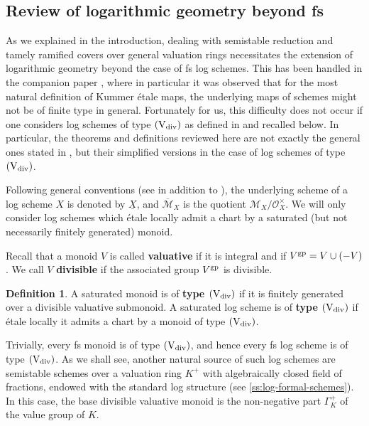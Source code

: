 \documentclass[a4paper,twoside,11pt,reqno]{amsart}
\newcommand{\cM}{{\mathcal M}}
\newcommand{\cO}{{\mathcal O}}
\newcommand{\gp}{{\rm gp}}
\newcommand{\typeVd}{(\mathrm{V}_{\rm div})}
\theoremstyle{definition}
\newtheorem{defi}[thm]{Definition}
\numberwithin{equation}{subsection}
\begin{document}
\subsection{Review of logarithmic geometry beyond fs} 
\label{ss:log-review}

As we explained in the introduction, dealing with semistable reduction and tamely ramified covers over general valuation rings necessitates the extension of logarithmic geometry beyond the case of fs log schemes. This has been handled in the companion paper \cite{AHLS-Log}, where in particular it was observed that for the most natural definition of Kummer \'etale maps, the underlying maps of schemes might not be of finite type in general. Fortunately for us, this difficulty does not occur if one considers log schemes of type $\typeVd$ as defined in \cite[\S 5]{AHLS-Log} and recalled below. In particular, the theorems and definitions reviewed here are not exactly the general ones stated in \cite{AHLS-Log}, but their simplified versions in the case of log schemes of type $\typeVd$.

Following general conventions (see \cite{Kato1989:LogarithmicStructures,Ogus,KatoToricSingularities} in addition to \cite{AHLS-Log}), the underlying scheme of a log scheme $X$ is denoted by $\underline{X}$, and $\overline{\cM}_{X}$ is the quotient $\cM_X/\cO_X^\times$. We will only consider log schemes which \'etale locally admit a chart by a saturated (but not necessarily finitely generated) monoid.  

Recall that a monoid $V$ is called {\bf valuative} if it is integral and if $V^\gp = V \cup (-V)$. We call $V$ {\bf divisible} if the associated group $V^\gp$ is divisible. 

\begin{defi} \label{def:log-sch-type-Vd}
    A saturated monoid is of {\bf type $\typeVd$} if it is finitely generated over a divisible valuative submonoid. A saturated log scheme is of {\bf type $\typeVd$} if \'etale locally it admits a chart by a monoid of type $\typeVd$.
\end{defi}

Trivially, every fs monoid is of type $\typeVd$, and hence every fs log scheme is of type $\typeVd$. As we shall see, another natural source of such log schemes are semistable schemes over a valuation ring $K^+$ with algebraically closed field of fractions, endowed with the standard log structure (see \cref{ss:log-formal-schemes}). In this case, the base divisible valuative monoid is the non-negative part $\Gamma_K^+$ of the value group of $K$.
\end{document}
